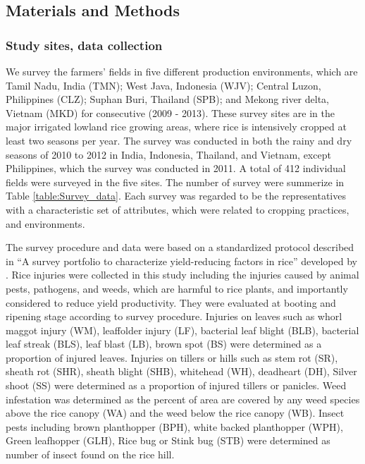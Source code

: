 \subsection{Materials and Methods}

\subsubsection{Study sites, data collection}

We survey the farmers' fields in five different production environments, which are Tamil Nadu, India (TMN); West Java, Indonesia (WJV); Central Luzon, Philippines (CLZ); Suphan Buri, Thailand (SPB); and Mekong river delta, Vietnam (MKD) for consecutive (2009 - 2013). These survey sites are in the major irrigated lowland rice growing areas, where rice is intensively cropped at least two seasons per year. The survey was conducted in both the rainy and dry seasons of 2010 to 2012 in India, Indonesia, Thailand, and Vietnam, except Philippines, which the survey was conducted in 2011. A total of 412 individual fields were surveyed in the five sites. The number of survey were summerize in Table \ref{table:Survey_data}. Each survey was regarded to be the representatives with a characteristic set of attributes, which were related to cropping practices, and environments.


The survey procedure and data were based on a standardized protocol described in ``A survey portfolio to characterize yield-reducing factors in rice'' developed by \citet{Savary_2009_Survey}. Rice injuries were collected in this study including the injuries caused by animal pests, pathogens, and weeds, which are harmful to rice plants, and importantly considered to reduce yield productivity. They were evaluated at booting and ripening stage according to survey procedure. Injuries on leaves such as whorl maggot injury (WM), leaffolder injury (LF), bacterial leaf blight (BLB), bacterial leaf streak (BLS), leaf blast (LB), brown spot (BS) were determined as a proportion of injured leaves. Injuries on tillers or hills such as stem rot (SR), sheath rot (SHR), sheath blight (SHB), whitehead (WH), deadheart (DH), Silver shoot (SS) were determined as a proportion of injured tillers or panicles. Weed infestation was determined as the percent of area are covered by any weed species above the rice canopy (WA) and the weed below the rice canopy (WB). Insect pests including brown planthopper (BPH), white backed planthopper (WPH), Green leafhopper (GLH), Rice bug or Stink bug (STB) were determined as number of insect found on the rice hill. 


